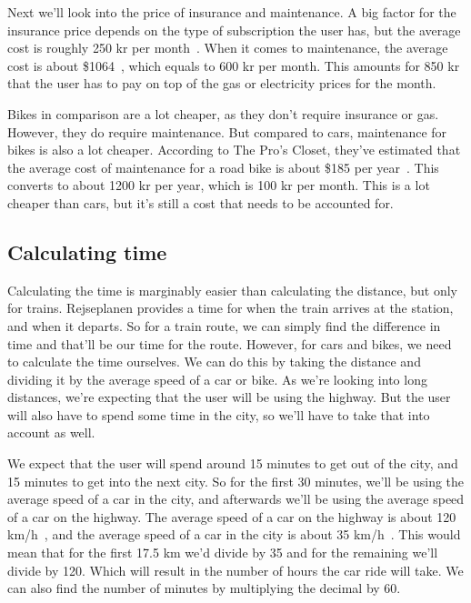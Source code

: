 Next we'll look into the price of insurance and maintenance.
A big factor for the insurance price depends on the type of subscription the user has, but the average cost is roughly
250 kr per month~\cite{price_insurance}.
When it comes to maintenance, the average cost is about \$1064~\cite{price_repair}, which equals to 600 kr per month.
This amounts for 850 kr that the user has to pay on top of the gas or electricity prices for the month.

Bikes in comparison are a lot cheaper, as they don't require insurance or gas.
However, they do require maintenance.
But compared to cars, maintenance for bikes is also a lot cheaper.
According to The Pro's Closet, they've estimated that the average cost of maintenance for a road bike is about \$185 per
year~\cite{price_bike}.
This converts to about 1200 kr per year, which is 100 kr per month.
This is a lot cheaper than cars, but it's still a cost that needs to be accounted for.

\subsection{Calculating time}\label{subsec:calculating-time}

Calculating the time is marginably easier than calculating the distance, but only for trains.
Rejseplanen provides a time for when the train arrives at the station, and when it departs.
So for a train route, we can simply find the difference in time and that'll be our time for the route.
However, for cars and bikes, we need to calculate the time ourselves.
We can do this by taking the distance and dividing it by the average speed of a car or bike.
As we're looking into long distances, we're expecting that the user will be using the highway.
But the user will also have to spend some time in the city, so we'll have to take that into account as well.

We expect that the user will spend around 15 minutes to get out of the city, and 15 minutes to get into the next city.
So for the first 30 minutes, we'll be using the average speed of a car in the city, and afterwards we'll be using the
average speed of a car on the highway.
The average speed of a car on the highway is about 120 km/h~\cite{time_highway}, and the average speed of a car in
the city is about 35 km/h~\cite{time_city}.
This would mean that for the first 17.5 km we'd divide by 35 and for the remaining we'll divide by 120.
Which will result in the number of hours the car ride will take.
We can also find the number of minutes by multiplying the decimal by 60.

